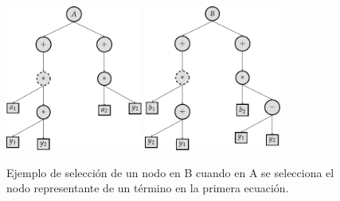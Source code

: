 \begin{itemize}
\begin{center}
              \begin{figure}[h]
                  \centering
                  \includegraphics[width=0.4\textwidth]{"figures/cross_term_1.pdf"}
                  \qquad
                  \includegraphics[width=0.4\textwidth]{"figures/cross_term_2.pdf"}
                  \caption{Ejemplo de selección de un nodo en B cuando en A se selecciona el nodo representante de un término en la primera ecuación.}
                  \label{tikzpicture:cross_term}
              \end{figure}
          \end{center}



\end{itemize}
